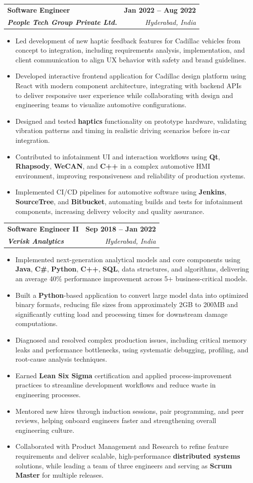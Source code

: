 \documentclass[letterpaper,11pt]{article}
\makeatletter
\newcommand{\resumeItem}[1]{
  \item\small{
    {#1 \vspace{-2pt}}
  }
}
\newcommand{\resumeSubheading}[4]{
  \vspace{-2pt}\item
    \begin{tabular*}{1.0\textwidth}[t]{l@{\extracolsep{\fill}}r}
      \textbf{#1} & \textbf{\small #2} \\
      \textit{\small#3} & \textit{\small #4} \\
    \end{tabular*}\vspace{-7pt}
}
\newcommand{\resumeItemListStart}{\begin{itemize}}
\newcommand{\resumeItemListEnd}{\end{itemize}\vspace{-5pt}}
\makeatother
\begin{document}
    \resumeSubheading
      {\textbf{Software Engineer}}{\textbf{Jan 2022 -- Aug 2022}}
      {\textbf{People Tech Group Private Ltd.}}{Hyderabad, India}
      \resumeItemListStart
        \resumeItem{Led development of new haptic feedback features for Cadillac vehicles from concept to integration, including requirements analysis, implementation, and client communication to align UX behavior with safety and brand guidelines.}
        \resumeItem{Developed interactive frontend application for Cadillac design platform using React with modern component architecture, integrating with backend APIs to deliver responsive user experience while collaborating with design and engineering teams to visualize automotive configurations.}
        \resumeItem{Designed and tested \textbf{haptics} functionality on prototype hardware, validating vibration patterns and timing in realistic driving scenarios before in-car integration.}
        \resumeItem{Contributed to infotainment UI and interaction workflows using \textbf{Qt}, \textbf{Rhapsody}, \textbf{WeCAN}, and \textbf{C++} in a complex automotive HMI environment, improving responsiveness and reliability of production systems.}
        \resumeItem{Implemented CI/CD pipelines for automotive software using \textbf{Jenkins}, \textbf{SourceTree}, and \textbf{Bitbucket}, automating builds and tests for infotainment components, increasing delivery velocity and quality assurance.}
      \resumeItemListEnd

    \resumeSubheading
      {\textbf{Software Engineer II}}{\textbf{Sep 2018 -- Jan 2022}}
      {\textbf{Verisk Analytics}}{Hyderabad, India}
      \resumeItemListStart
        \resumeItem{Implemented next-generation analytical models and core components using \textbf{Java}, \textbf{C\#}, \textbf{Python}, \textbf{C++}, \textbf{SQL}, data structures, and algorithms, delivering an average 40\% performance improvement across 5+ business-critical models.}
        \resumeItem{Built a \textbf{Python}-based application to convert large model data into optimized binary formats, reducing file sizes from approximately 2GB to 200MB and significantly cutting load and processing times for downstream damage computations.}
        \resumeItem{Diagnosed and resolved complex production issues, including critical memory leaks and performance bottlenecks, using systematic debugging, profiling, and root-cause analysis techniques.}
        \resumeItem{Earned \textbf{Lean Six Sigma} certification and applied process-improvement practices to streamline development workflows and reduce waste in engineering processes.}
        \resumeItem{Mentored new hires through induction sessions, pair programming, and peer reviews, helping onboard engineers faster and strengthening overall engineering culture.}
        \resumeItem{Collaborated with Product Management and Research to refine feature requirements and deliver scalable, high-performance \textbf{distributed systems} solutions, while leading a team of three engineers and serving as \textbf{Scrum Master} for multiple releases.}
      \resumeItemListEnd
\end{document}
